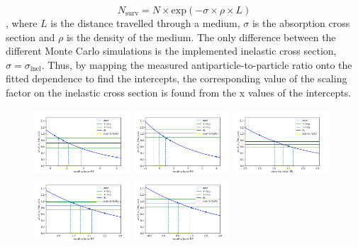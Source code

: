 \begin{equation}\label{eq:LambertBeer}
    N_{\mathrm{surv}} = N \times \mathrm{exp}\left( -\sigma \times \rho \times L \right)
\end{equation}
, where $L$ is the distance travelled through a medium, $\sigma$ is the absorption cross section and $\rho$ is the density of the medium. The only difference between the different Monte Carlo simulations is the implemented inelastic cross section, $\sigma = \sigma_\mathrm{inel}$. Thus, by mapping the measured antiparticle-to-particle ratio onto the fitted dependence to find the intercepts, the corresponding value of the scaling factor on the inelastic cross section is found from the x values of the intercepts. \\

\begin{figure}
    \centering
    \includegraphics[width=0.32\textwidth]{figures/he3_rescaling/Bin_2_scaling.png}
    \includegraphics[width=0.32\textwidth]{figures/he3_rescaling/Bin_3_scaling.png}
    \includegraphics[width=0.32\textwidth]{figures/he3_rescaling/Bin_4_scaling.png}
    \includegraphics[width=0.32\textwidth]{figures/he3_rescaling/Bin_5_scaling.png}
    \includegraphics[width=0.32\textwidth]{figures/he3_rescaling/Bin_6_scaling.png}

\end{figure}
